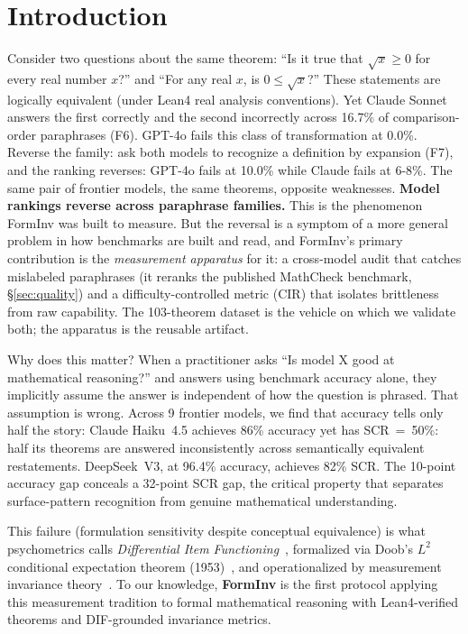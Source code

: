 \documentclass{article}
\begin{document}
\section{Introduction}
\label{sec:intro}

Consider two questions about the same theorem:
``Is it true that $\sqrt{x} \geq 0$ for every real number $x$?''
and ``For any real $x$, is $0 \leq \sqrt{x}$?''
These statements are logically equivalent (under Lean4 real analysis conventions).
Yet Claude Sonnet answers the first correctly and the second incorrectly across 16.7\% of
comparison-order paraphrases (F6).
GPT-4o fails this class of transformation at 0.0\%.
Reverse the family: ask both models to recognize a definition by expansion (F7),
and the ranking reverses: GPT-4o fails at 10.0\% while Claude fails at 6-8\%.
The same pair of frontier models, the same theorems, opposite weaknesses.
\textbf{Model rankings reverse across paraphrase families.}
This is the phenomenon FormInv was built to measure. But the reversal is a symptom of a more
general problem in how benchmarks are built and read, and FormInv's primary contribution is the
\emph{measurement apparatus} for it: a cross-model audit that catches mislabeled paraphrases (it
reranks the published MathCheck benchmark, \S\ref{sec:quality}) and a difficulty-controlled
metric (CIR) that isolates brittleness from raw capability. The 103-theorem dataset is the
vehicle on which we validate both; the apparatus is the reusable artifact.

Why does this matter?
When a practitioner asks ``Is model X good at mathematical reasoning?''
and answers using benchmark accuracy alone, they implicitly assume the answer is
independent of how the question is phrased.
That assumption is wrong.
Across 9 frontier models, we find that accuracy tells only half the story:
Claude Haiku~4.5 achieves 86\% accuracy yet has SCR~=~50\%:
half its theorems are answered inconsistently across semantically equivalent restatements.
DeepSeek~V3, at 96.4\% accuracy, achieves 82\% SCR.
The 10-point accuracy gap conceals a 32-point SCR gap, the
critical property that separates surface-pattern recognition from genuine mathematical understanding.

This failure (formulation sensitivity despite conceptual equivalence)
is what psychometrics calls \emph{Differential Item Functioning}~\citep{holland1988},
formalized via Doob's $L^2$ conditional expectation theorem (1953)~\citep{doob1953},
and operationalized by measurement invariance theory~\citep{vandenberg2000}.
To our knowledge, \textbf{FormInv} is the first protocol applying this measurement tradition
to formal mathematical reasoning with Lean4-verified theorems and DIF-grounded invariance metrics.
\end{document}

